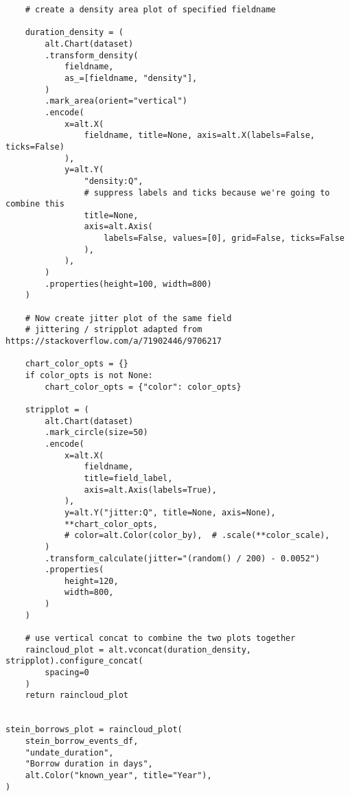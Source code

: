 \documentclass[final]{anthology-ch} %
\begin{document}
\begin{verbatim}
    # create a density area plot of specified fieldname

    duration_density = (
        alt.Chart(dataset)
        .transform_density(
            fieldname,
            as_=[fieldname, "density"],
        )
        .mark_area(orient="vertical")
        .encode(
            x=alt.X(
                fieldname, title=None, axis=alt.X(labels=False, ticks=False)
            ),
            y=alt.Y(
                "density:Q",
                # suppress labels and ticks because we're going to combine this
                title=None,
                axis=alt.Axis(
                    labels=False, values=[0], grid=False, ticks=False
                ),
            ),
        )
        .properties(height=100, width=800)
    )

    # Now create jitter plot of the same field
    # jittering / stripplot adapted from https://stackoverflow.com/a/71902446/9706217

    chart_color_opts = {}
    if color_opts is not None:
        chart_color_opts = {"color": color_opts}

    stripplot = (
        alt.Chart(dataset)
        .mark_circle(size=50)
        .encode(
            x=alt.X(
                fieldname,
                title=field_label,
                axis=alt.Axis(labels=True),
            ),
            y=alt.Y("jitter:Q", title=None, axis=None),
            **chart_color_opts,
            # color=alt.Color(color_by),  # .scale(**color_scale),
        )
        .transform_calculate(jitter="(random() / 200) - 0.0052")
        .properties(
            height=120,
            width=800,
        )
    )

    # use vertical concat to combine the two plots together
    raincloud_plot = alt.vconcat(duration_density, stripplot).configure_concat(
        spacing=0
    )
    return raincloud_plot


stein_borrows_plot = raincloud_plot(
    stein_borrow_events_df,
    "undate_duration",
    "Borrow duration in days",
    alt.Color("known_year", title="Year"),
)

\end{verbatim}
\end{document}
